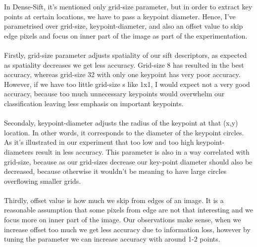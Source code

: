 \documentclass[12pt]{article}
\begin{document}
\begin{center}
        \vspace*{0.5cm}

        In Dense-Sift, it's mentioned only grid-size parameter, but in order to extract key points at certain locations, we have to pass a keypoint diameter.
        Hence, I've parametrised over grid-size, keypoint-diameter, and also an offset value to skip edge pixels and focus on inner part of the image as part of the experimentation.
        \\~\\
        Firstly, grid-size parameter adjusts spatiality of our sift descriptors, as expected as spatiality decreases we get less accuracy.
        Grid-size 8 has resulted in the best accuracy, whereas grid-size 32 with only one keypoint has very poor accuracy.
        However, if we have too little grid-size s like 1x1, I would expect not a very good accuracy, because too much unnecessary keypoints would overwhelm our classification leaving less emphasis on important keypoints.
        \\~\\
        Secondaly, keypoint-diameter adjusts the radius of the keypoint at that (x,y) location. In other words, it corresponds to the diameter of the keypoint circles.
        As it's illustrated in our experiment that too low and too high keypoint-diameters result in less accuracy. This parameter is also in a way correlated with grid-size, because as our grid-sizes decrease
        our key-point diameter should also be decreased, because otherwise it wouldn't be meaning to have large circles overflowing smaller grids.
        \\~\\
        Thirdly, offset value is how much we skip from edges of an image.
        It is a reasonable assumption that some pixels from edge are not that interesting and we focus more on inner part of the image.
        Our observations make sense, when we increase offset too much we get less accuracy due to information loss, however by tuning the parameter we can increase accuracy with around 1-2 points.

    \end{center}
\end{document}
